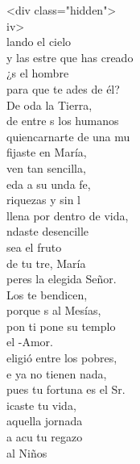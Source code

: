 \documentclass[12pt]{article}
\begin{document}
\begin{multicols*}{2}
\begin{cancion}%
<div class="hidden">\\
	iv>\\
	lando el cielo \\
	y las estre que has creado\\
	¿s el hombre  \\
	para que te ades de él?\\
	De oda la Tierra, \\
	de entre s los humanos\\
	quiencarnarte de una mu\\
	fijaste en María, \\
	ven tan sencilla,\\
	eda a su unda fe,\\
	 riquezas y sin l\\
llena por dentro de vida,\\
	ndaste desencille  \\
	 sea el fruto \\
	de tu tre, María\\
	peres la elegida Señor.\\
	Los  te bendicen, \\
	porque s al Mesías,\\
	pon ti pone su templo \\
	el -Amor.\\
	eligió entre los pobres, \\
	e ya no tienen nada,\\
	pues tu  fortuna es el Sr.\\
	icaste tu vida, \\
	aquella jornada\\
	a acu tu regazo \\
	al Niños  \\\jump\\

\end{cancion}
\end{multicols*}
\end{document}
